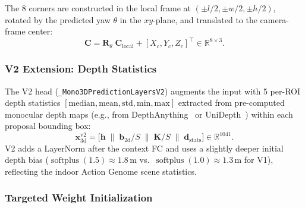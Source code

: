 \documentclass[runningheads]{llncs}
\newcommand{\mR}{\mathbb{R}}
\newcommand{\op}[1]{\operatorname{#1}}
\newcommand{\mat}[1]{\bm{#1}}
\begin{document}
The 8 corners are constructed in the local frame at $(\pm l/2, \pm w/2, \pm h/2)$, rotated by the predicted yaw $\theta$ in the $xy$-plane, and translated to the camera-frame center:
\begin{equation}
    \mat{C} = \mat{R}_\theta \; \mat{C}_{\text{local}} + [X_c, Y_c, Z_c]^\top \in \mR^{8 \times 3}.
    \label{eq:corners}
\end{equation}

\subsubsection{V2 Extension: Depth Statistics}
\label{sec:3d_v2}

The V2 head (\texttt{\_Mono3DPredictionLayersV2}) augments the input with 5 per-ROI depth statistics $[\text{median}, \text{mean}, \text{std}, \text{min}, \text{max}]$ extracted from pre-computed monocular depth maps (e.g., from DepthAnything~\cite{yang2024depth} or UniDepth~\cite{piccinelli2024unidepth}) within each proposal bounding box:
\begin{equation}
    \mat{x}_{\text{3d}}^{\text{v2}} = \bigl[\mat{h} \;\|\; \mat{b}_{\text{2d}} / S \;\|\; \mat{K} / S \;\|\; \mat{d}_{\text{stats}}\bigr] \in \mR^{1041}.
    \label{eq:3d_v2_input}
\end{equation}
V2 adds a LayerNorm after the context FC and uses a slightly deeper initial depth bias ($\op{softplus}(1.5) \approx 1.8$\,m vs.\ $\op{softplus}(1.0) \approx 1.3$\,m for V1), reflecting the indoor Action Genome scene statistics.


\subsubsection{Targeted Weight Initialization}
\label{sec:3d_init}
\end{document}
